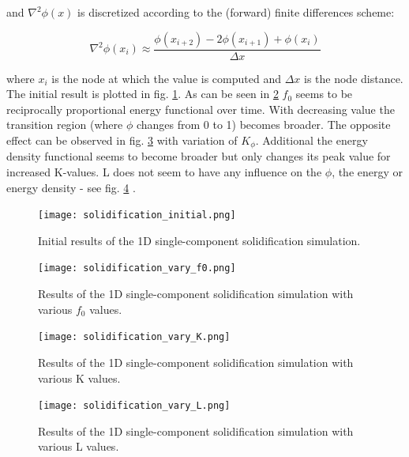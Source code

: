 and \(\nabla^{2} \phi(x) \) is discretized according to the (forward) finite differences scheme:

\begin{equation}
	\nabla^{2} \phi(x_{i}) \approx \frac{\phi(x_{i+2}) - 2\phi(x_{i+1}) + \phi(x_{i}) }{\Delta x} 
\end{equation}

where \(x_{i}\) is the node at which the value is computed and \(\Delta x\) is the node distance. The initial result is plotted in fig. \ref{fig:solidification_init}. As can be seen in \ref{fig:solidification_f0} \(f_{0}\) seems to be reciprocally proportional energy functional over time. With decreasing value the transition region (where \(\phi\) changes from 0 to 1) becomes broader. The opposite effect can be observed in fig. \ref{fig:solidification_K} with variation of \(K_{\phi}\). Additional the energy density functional seems to become broader but only changes its peak value for increased K-values. L does not seem to have any influence on the \(\phi\), the energy or energy density - see fig. \ref{fig:solidification_L} .


\begin{figure}[htb]
	\centering
	\texttt{[image: solidification\_initial.png]}\label{fig:solidification_init}
	\caption{Initial results of the 1D single-component solidification simulation.}
\end{figure}

\begin{figure}[htb]
	\centering
	\texttt{[image: solidification\_vary\_f0.png]}\label{fig:solidification_f0}
	\caption{Results of the 1D single-component solidification simulation with various \(f_{0}\) values.}
\end{figure}

\begin{figure}[htb]
	\centering
	\texttt{[image: solidification\_vary\_K.png]}\label{fig:solidification_K}
	\caption{Results of the 1D single-component solidification simulation with various K values.}
\end{figure}


\begin{figure}[htb]
	\centering
	\texttt{[image: solidification\_vary\_L.png]}\label{fig:solidification_L}
	\caption{Results of the 1D single-component solidification simulation with various L values.}
\end{figure}


\printbibliography


